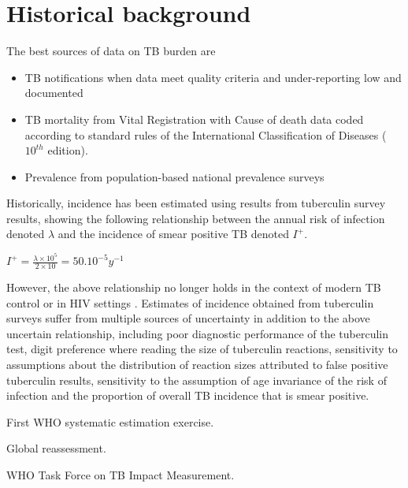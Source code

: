 \section{Historical background}

The best sources of data on TB burden are 
\begin{itemize}
\item TB notifications when data meet quality criteria and under-reporting low and documented
\item TB mortality from Vital Registration with Cause of death data coded according to standard rules of the International Classification of Diseases ($10^{th}$ edition).
\item Prevalence from population-based national prevalence surveys
\end{itemize}

Historically, incidence has been estimated using results from tuberculin survey results\cite{Styblo1985}, showing the following relationship between the annual risk of infection denoted $\lambda$ and the incidence of smear positive TB denoted $I^+$.

$I^+ = \frac{\lambda \times 10^5}{2 \times 10} = 50.10^{-5} y^{-1}$

However, the above relationship no longer holds in the context of modern TB control or in HIV settings \cite{18235886}. Estimates of incidence obtained from tuberculin surveys suffer from multiple sources of uncertainty in addition to the above uncertain relationship, including poor diagnostic performance of the tuberculin test, digit preference where reading the size of tuberculin reactions, sensitivity to assumptions about the distribution of reaction sizes attributed to false positive tuberculin results, sensitivity to the assumption of age invariance of the risk of infection and the proportion of overall TB incidence that is smear positive. 

First WHO systematic estimation exercise\cite{1600578}.

Global reassessment\cite{10517722}.

WHO Task Force on TB Impact Measurement\cite{18201929}.



  
  
  
  
  
  
  
  
  
  
  